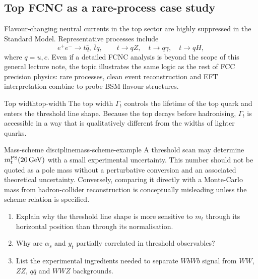 \documentclass[11pt,a4paper]{article}
\newcommand{\GeV}{\mathrm{GeV}}
\numberwithin{equation}{section}
\begin{document}
\subsection{Top FCNC as a rare-process case study}
Flavour-changing neutral currents in the top sector are highly suppressed in the Standard Model. Representative processes include
\begin{equation}
  e^+e^-\to t\bar q,\ \bar t q,
  \qquad
  t\to qZ,\quad t\to q\gamma,\quad t\to qH,
\end{equation}
where \(q=u,c\). Even if a detailed FCNC analysis is beyond the scope of this general lecture note, the topic illustrates the same logic as the rest of FCC precision physics: rare processes, clean event reconstruction and EFT interpretation combine to probe BSM flavour structures.

\begin{definition}{Top width}{top-width}
The top width \(\Gamma_t\) controls the lifetime of the top quark and enters the threshold line shape. Because the top decays before hadronising, \(\Gamma_t\) is accessible in a way that is qualitatively different from the widths of lighter quarks.
\end{definition}

\begin{examplebox}{Mass-scheme discipline}{mass-scheme-example}
A threshold scan may determine \(m_t^{\rm PS}(20\,\GeV)\) with a small experimental uncertainty. This number should not be quoted as a pole mass without a perturbative conversion and an associated theoretical uncertainty. Conversely, comparing it directly with a Monte-Carlo mass from hadron-collider reconstruction is conceptually misleading unless the scheme relation is specified.
\end{examplebox}

\begin{guidedchecksbox}
\begin{enumerate}[leftmargin=1.6em]
\item Explain why the threshold line shape is more sensitive to \(m_t\) through its horizontal position than through its normalisation.
\item Why are \(\alpha_s\) and \(y_t\) partially correlated in threshold observables?
\item List the experimental ingredients needed to separate \(WbWb\) signal from \(WW\), \(ZZ\), \(q\bar q\) and \(WWZ\) backgrounds.
\end{enumerate}
\end{guidedchecksbox}
\end{document}
